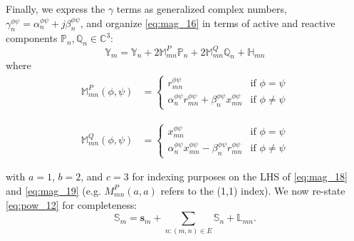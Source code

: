 Finally, we express the $\gamma$ terms as generalized complex numbers, $\gamma_{n}^{\phi \psi} = \alpha_{n}^{\phi \psi} + j\beta_{n}^{\phi \psi} $, and organize \eqref{eq:mag_16} in terms of active and reactive components $\mathbb{P}_{n},\mathbb{Q}_{n} \in \mathbb C^{3}$:
\begin{equation}
	\mathbb{Y}_{m} = \mathbb{Y}_{n} + 2 \mathbb{M}_{mn}^{P} \mathbb{P}_{n} + 2 \mathbb{M}_{mn}^{Q} \mathbb{Q}_{n} + \mathbb{H}_{mn} \label{eq:mag_17}
\end{equation}
\noindent where
\begin{align}
	\mathbb{M}_{mn}^{P} (\phi, \psi) &= \begin{cases}
    	 r_{mn}^{\phi \psi} &\mbox{if } \phi = \psi \\
         \alpha_{n}^{\phi \psi} r_{mn}^{\phi \psi} + \beta_{n}^{\phi \psi} x_{mn}^{\phi \psi} &\mbox{if } \phi \ne \psi
    \end{cases} \label{eq:mag_18}
\end{align}

\begin{align}
	\mathbb{M}_{mn}^{Q} (\phi, \psi) &= \begin{cases}
    	 x_{mn}^{\phi \psi} &\mbox{if } \phi = \psi \\
         \alpha_{n}^{\phi \psi} x_{mn}^{\phi \psi} - \beta_{n}^{\phi \psi} r_{mn}^{\phi \psi} &\mbox{if } \phi \ne \psi
    \end{cases} \label{eq:mag_19}
\end{align}

    

\noindent with $a=1$, $b=2$, and $c=3$ for indexing purposes on the LHS of \eqref{eq:mag_18} and \eqref{eq:mag_19} (e.g. $M^{P}_{mn}(a,a)$ refers to the (1,1) index). We now re-state \eqref{eq:pow_12} for completeness:
\begin{equation}
	\mathbb{S}_{m} = \mathbf{s}_{m} + \sum_{n:(m,n) \in E} \mathbb{S}_{n} + \mathbb{L}_{mn}
    \label{eq:pow_13}.
\end{equation}

